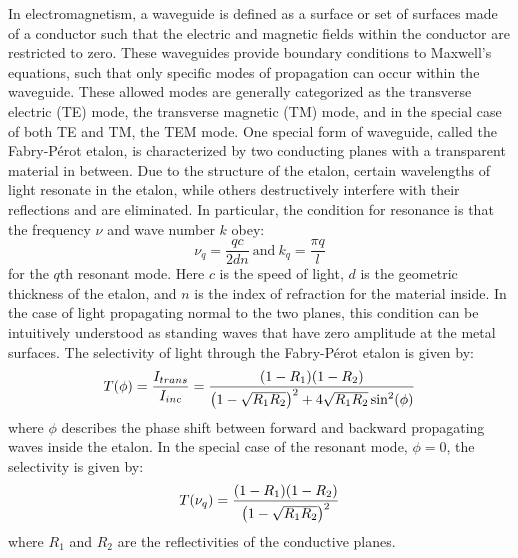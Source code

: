 \documentclass{report}
\begin{document}
        In electromagnetism, a waveguide is defined as a surface or set of surfaces made of a conductor such that the electric and magnetic fields within the conductor are restricted to zero. These waveguides provide boundary conditions to Maxwell's equations, such that only specific modes of propagation can occur within the waveguide. These allowed modes are generally categorized as the transverse electric (TE) mode, the transverse magnetic (TM) mode, and in the special case of both TE and TM, the TEM mode.\cite{griffiths1999} One special form of waveguide, called the Fabry-P\'erot etalon, is characterized by two conducting planes with a transparent material in between. Due to the structure of the etalon, certain wavelengths of light resonate in the etalon, while others destructively interfere with their reflections and are eliminated.\cite{Ismail2016} In particular, the condition for resonance is that the frequency $\nu$ and wave number $k$ obey:
        \begin{equation}
            \nu_q=\frac{qc}{2dn}\ \mathrm{and}\ k_q=\frac{\pi q}{l}
        \end{equation}
        for the $q$th resonant mode. Here $c$ is the speed of light, $d$ is the geometric thickness of the etalon, and $n$ is the index of refraction for the material inside.\cite{Pollnau2018} In the case of light propagating normal to the two planes, this condition can be intuitively understood as standing waves that have zero amplitude at the metal surfaces. The selectivity of light through the Fabry-P\'erot etalon is given by:
        \begin{equation}
            T(\phi)=\frac{I_{trans}}{I_{inc}}=\frac{\qty(1-R_1)\qty(1-R_2)}{\qty(1-\sqrt{R_1R_2})^2+4\sqrt{R_1R_2}\sin^2(\phi)}
        \end{equation}
        where $\phi$ describes the phase shift between forward and backward propagating waves inside the etalon. In the special case of the resonant mode, $\phi=0$, the selectivity is given by:
        \begin{equation}
            T\qty(\nu_q)=\frac{\qty(1-R_1)\qty(1-R_2)}{\qty(1-\sqrt{R_1R_2})^2}
        \end{equation}
        where $R_1$ and $R_2$ are the reflectivities of the conductive planes.\cite{siegman1986}
        
\end{document}
